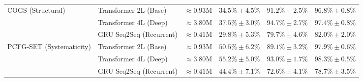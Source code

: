 \documentclass{article}
\theoremstyle{plain}
\theoremstyle{definition}
\begin{document}
\begin{table}[t]
\begin{small}
\begin{sc}
{\begin{tabular}{llcccc}
\midrule
COGS (Structural) 
  & Transformer 2L (Base) & $\approx 0.93\text{M}$ & $34.5\% \pm 4.5\%$ & $91.2\% \pm 2.5\%$ & $96.8\% \pm 0.8\%$ \\
  & Transformer 4L (Deep) & $\approx 3.80\text{M}$ & $37.5\% \pm 3.0\%$ & $94.7\% \pm 2.7\%$ & $97.4\% \pm 0.8\%$ \\
  & GRU Seq2Seq (Recurrent) & $\approx 0.41\text{M}$ & $29.8\% \pm 5.3\%$ & $79.7\% \pm 4.6\%$ & $82.0\% \pm 2.0\%$ \\
\midrule
PCFG-SET (Systematicity) 
  & Transformer 2L (Base) & $\approx 0.93\text{M}$ & $50.5\% \pm 6.2\%$ & $89.1\% \pm 3.2\%$ & $97.9\% \pm 0.6\%$ \\
  & Transformer 4L (Deep) & $\approx 3.80\text{M}$ & $55.2\% \pm 5.0\%$ & $93.0\% \pm 1.7\%$ & $98.3\% \pm 0.5\%$ \\
  & GRU Seq2Seq (Recurrent) & $\approx 0.41\text{M}$ & $44.4\% \pm 7.1\%$ & $72.6\% \pm 4.1\%$ & $78.7\% \pm 3.5\%$ \\
\bottomrule
\end{tabular}%
}
\end{sc}
\end{small}
\end{table}
\end{document}
